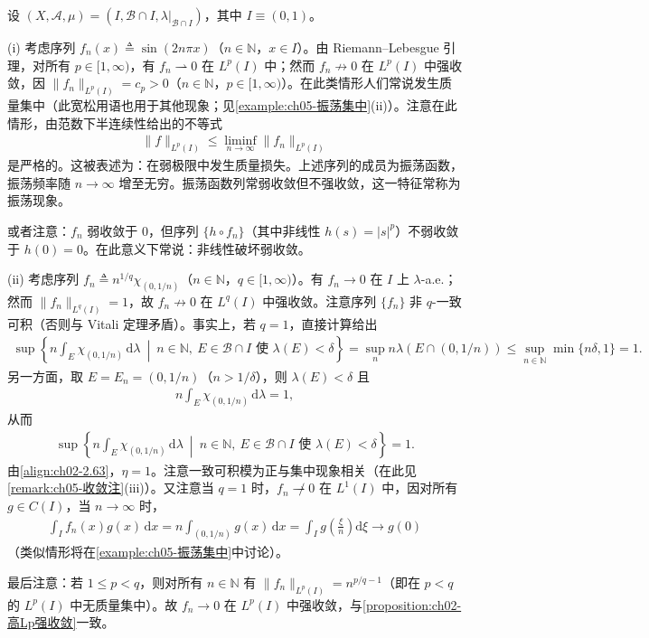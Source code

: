 \documentclass[../../main.tex]{subfiles}%
\begin{document}
\begin{example}\label{example:ch02-非线性弱星}
\label{example:ch02-弱收敛振荡}
设 $(X,\mathscr A,\mu)=(I,\mathscr B\cap I,\lambda|_{\mathscr B\cap I})$，其中 $I\equiv(0,1)$。

(i) 考虑序列 $f_n(x)\triangleq \sin(2n\pi x)$（$n\in\mathbb N$，$x\in I$）。由 Riemann--Lebesgue 引理，对所有 $p\in[1,\infty)$，有 $f_n\rightharpoonup0$ 在 $L^p(I)$ 中；然而 $f_n\not\to0$ 在 $L^p(I)$ 中强收敛，因 $\|f_n\|_{L^p(I)}=c_p>0$（$n\in\mathbb N$，$p\in[1,\infty)$）。在此类情形人们常说发生质量集中（此宽松用语也用于其他现象；见\cref{example:ch05-振荡集中}(ii)）。注意在此情形，由范数下半连续性给出的不等式
\begin{align*}
\|f\|_{L^p(I)}\leqslant\liminf_{n\to\infty}\|f_n\|_{L^p(I)}
\end{align*}
是严格的。这被表述为：在弱极限中发生质量损失。上述序列的成员为振荡函数，振荡频率随 $n\to\infty$ 增至无穷。振荡函数列常弱收敛但不强收敛，这一特征常称为振荡现象。

或者注意：$f_n$ 弱收敛于 $0$，但序列 $\{h\circ f_n\}$（其中非线性 $h(s)=|s|^p$）不弱收敛于 $h(0)=0$。在此意义下常说：非线性破坏弱收敛。

(ii) 考虑序列 $f_n\triangleq n^{1/q}\chi_{(0,1/n)}$（$n\in\mathbb N$，$q\in[1,\infty)$）。有 $f_n\to0$ 在 $I$ 上 $\lambda$-a.e.；然而 $\|f_n\|_{L^q(I)}=1$，故 $f_n\not\to0$ 在 $L^q(I)$ 中强收敛。注意序列 $\{f_n\}$ 非 $q$-一致可积（否则与 Vitali 定理矛盾）。事实上，若 $q=1$，直接计算给出
\begin{align*}
\sup\left\{n\int_E\chi_{(0,1/n)}\,\mathrm{d}\lambda\ \middle|\ n\in\mathbb N,\ E\in\mathscr B\cap I\text{ 使 }\lambda(E)<\delta\right\}
=\sup_n n\lambda(E\cap(0,1/n))\leqslant\sup_{n\in\mathbb N}\min\{n\delta,1\}=1.
\end{align*}
另一方面，取 $E=E_n=(0,1/n)$（$n>1/\delta$），则 $\lambda(E)<\delta$ 且
\begin{align*}
n\int_E\chi_{(0,1/n)}\,\mathrm{d}\lambda=1,
\end{align*}
从而
\begin{align*}
\sup\left\{n\int_E\chi_{(0,1/n)}\,\mathrm{d}\lambda\ \middle|\ n\in\mathbb N,\ E\in\mathscr B\cap I\text{ 使 }\lambda(E)<\delta\right\}=1.
\end{align*}
由\eqref{align:ch02-2.63}，$\eta=1$。注意一致可积模为正与集中现象相关（在此见\cref{remark:ch05-收敛注}(iii)）。又注意当 $q=1$ 时，$f_n\not\rightharpoonup0$ 在 $L^1(I)$ 中，因对所有 $g\in C(I)$，当 $n\to\infty$ 时，
\begin{align*}
\int_I f_n(x)g(x)\,\mathrm{d}x=n\int_{(0,1/n)}g(x)\,\mathrm{d}x=\int_I g\left(\frac{\xi}{n}\right)\mathrm{d}\xi\to g(0)
\end{align*}
（类似情形将在\cref{example:ch05-振荡集中}中讨论）。

最后注意：若 $1\leqslant p<q$，则对所有 $n\in\mathbb N$ 有 $\|f_n\|_{L^p(I)}=n^{p/q-1}$（即在 $p<q$ 的 $L^p(I)$ 中无质量集中）。故 $f_n\to0$ 在 $L^p(I)$ 中强收敛，与\cref{proposition:ch02-高Lp强收敛}一致。
\end{example}
\end{document}
